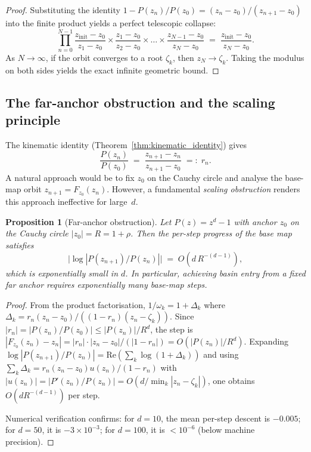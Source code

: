 \documentclass[10pt,a4paper,oneside]{book}
\newtheorem{proposition}[theorem]{Proposition}
\theoremstyle{definition}
\theoremstyle{remark}
\begin{document}
\begin{proof}
Substituting the identity $1 - P(z_n)/P(z_0) = (z_n - z_0)/(z_{n+1} - z_0)$ into the finite product yields a perfect telescopic collapse:
\[
  \prod_{n=0}^{N-1} \frac{z_{\mathrm{init}} - z_0}{z_1 - z_0} \times \frac{z_1 - z_0}{z_2 - z_0} \times \dots \times \frac{z_{N-1} - z_0}{z_N - z_0} \;=\; \frac{z_{\mathrm{init}} - z_0}{z_N - z_0}.
\]
As $N \to \infty$, if the orbit converges to a root $\zeta_k$, then $z_N \to \zeta_k$. Taking the modulus on both sides yields the exact infinite geometric bound.
\end{proof}

\subsection{The far-anchor obstruction and the scaling principle}
\label{sec:far_anchor_obstruction}

The kinematic identity (Theorem~\ref{thm:kinematic_identity}) gives
\begin{equation}
  \label{eq:kinematic_ratio}
  \frac{P(z_n)}{P(z_0)}
  \;=\; \frac{z_{n+1} - z_n}{z_{n+1} - z_0}
  \;=:\; r_n.
\end{equation}
A natural approach would be to fix $z_0$ on the Cauchy circle and analyse the base-map orbit $z_{n+1} = F_{z_0}(z_n)$.  However, a fundamental \emph{scaling obstruction} renders this approach ineffective for large~$d$.

\begin{proposition}[Far-anchor obstruction]
\label{prop:far_anchor}
Let $P(z) = z^d - 1$ with anchor $z_0$ on the Cauchy circle $|z_0| = R = 1 + \rho$.  Then the per-step progress of the base map satisfies
\begin{equation}
  \label{eq:far_anchor_rate}
  \bigl|\log|P(z_{n+1})/P(z_n)|\bigr| \;=\; O\!\left(d\,R^{-(d-1)}\right),
\end{equation}
which is \emph{exponentially small} in $d$.  In particular, achieving basin entry from a fixed far anchor requires exponentially many base-map steps.
\end{proposition}

\begin{proof}
From the product factorisation, $1/\omega_k = 1 + \Delta_k$ where $\Delta_k = r_n(z_n - z_0)/((1-r_n)(z_n - \zeta_k))$.  Since $|r_n| = |P(z_n)/P(z_0)| \leq |P(z_n)|/R^d$, the step is $|F_{z_0}(z_n) - z_n| = |r_n| \cdot |z_n - z_0|/(|1 - r_n|) = O(|P(z_n)|/R^d)$.  Expanding $\log|P(z_{n+1})/P(z_n)| = \text{Re}(\sum_k \log(1 + \Delta_k))$ and using $\sum_k \Delta_k = r_n(z_n - z_0)u(z_n)/(1-r_n)$ with $|u(z_n)| = |P'(z_n)/P(z_n)| = O(d/\min_k|z_n - \zeta_k|)$, one obtains $O(d R^{-(d-1)})$ per step.

Numerical verification confirms: for $d = 10$, the mean per-step descent is $-0.005$; for $d = 50$, it is $-3 \times 10^{-3}$; for $d = 100$, it is $< 10^{-6}$ (below machine precision).
\end{proof}
\end{document}
